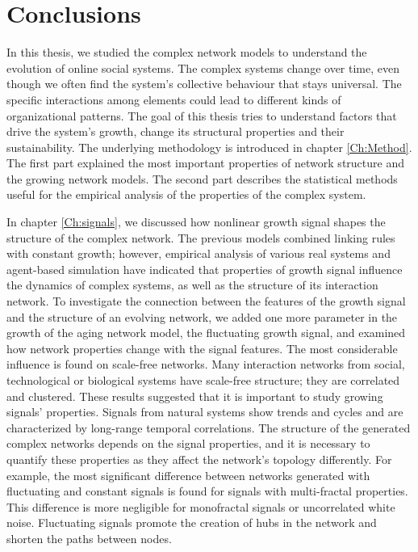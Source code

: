 \chapter{Conclusions} %
\label{Ch:Conclussion}

In this thesis, we studied the complex network models to understand the evolution of online social systems. %
The complex systems change over time, even though we often find the system's collective behaviour that stays universal. The specific interactions among elements could lead to different kinds of organizational patterns. The goal of this thesis tries to understand factors that drive the system's growth, change its structural properties and their sustainability.
The underlying methodology is introduced in chapter \ref{Ch:Method}. The first part explained the most important properties of network structure and the growing network models. The second part describes the statistical methods useful for the empirical analysis of the properties of the complex system.  

In chapter \ref{Ch:signals}, we discussed how nonlinear growth signal shapes the structure of the complex network. 
The previous models combined linking rules with constant growth; however, empirical analysis of various real systems and agent-based simulation \cite{mitrovic2012, mitrovic2015} have indicated that properties of growth signal influence the dynamics of complex systems, as well as the structure of its interaction network. To investigate the connection between the features of the growth signal and the structure of an evolving network, we added one more parameter in the growth of the aging network model, the fluctuating growth signal, and examined how network properties change with the signal features.
The most considerable influence is found on scale-free networks. Many interaction networks from social, technological or biological systems have scale-free structure; they are correlated and clustered. These results suggested that it is important to study growing signals' properties. Signals from natural systems show trends and cycles and are characterized by long-range temporal correlations. The structure of the generated complex networks depends on the signal properties, and it is necessary to quantify these properties as they affect the network's topology differently. For example, the most significant difference between networks generated with fluctuating and constant signals is found for signals with multi-fractal properties. This difference is more negligible for monofractal signals or uncorrelated white noise. Fluctuating signals promote the creation of hubs in the network and shorten the paths between nodes.

